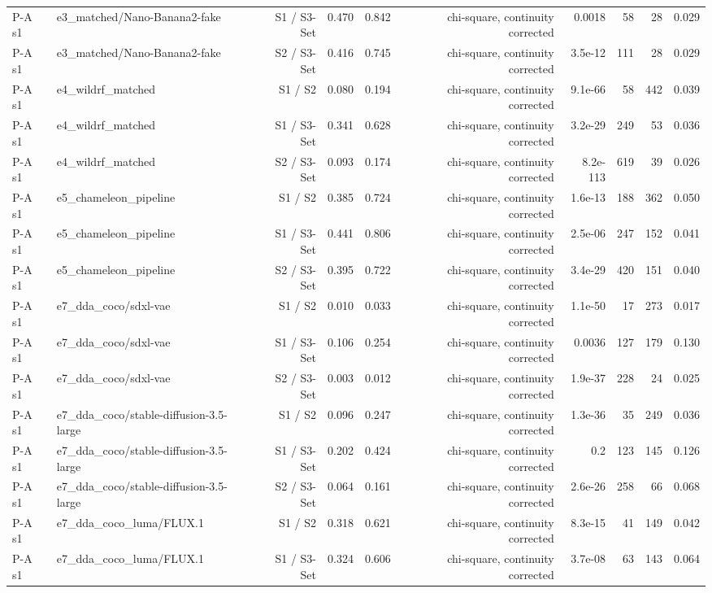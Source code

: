 \begin{table}[htbp]
\begin{tabular}{llrrrrrrrr}
P-A s1 & e3\_matched/Nano-Banana2-fake & S1 / S3-Set & 0.470 & 0.842 & chi-square, continuity corrected & 0.0018 & 58 & 28 & 0.029 \\
P-A s1 & e3\_matched/Nano-Banana2-fake & S2 / S3-Set & 0.416 & 0.745 & chi-square, continuity corrected & 3.5e-12 & 111 & 28 & 0.029 \\
P-A s1 & e4\_wildrf\_matched & S1 / S2 & 0.080 & 0.194 & chi-square, continuity corrected & 9.1e-66 & 58 & 442 & 0.039 \\
P-A s1 & e4\_wildrf\_matched & S1 / S3-Set & 0.341 & 0.628 & chi-square, continuity corrected & 3.2e-29 & 249 & 53 & 0.036 \\
P-A s1 & e4\_wildrf\_matched & S2 / S3-Set & 0.093 & 0.174 & chi-square, continuity corrected & 8.2e-113 & 619 & 39 & 0.026 \\
P-A s1 & e5\_chameleon\_pipeline & S1 / S2 & 0.385 & 0.724 & chi-square, continuity corrected & 1.6e-13 & 188 & 362 & 0.050 \\
P-A s1 & e5\_chameleon\_pipeline & S1 / S3-Set & 0.441 & 0.806 & chi-square, continuity corrected & 2.5e-06 & 247 & 152 & 0.041 \\
P-A s1 & e5\_chameleon\_pipeline & S2 / S3-Set & 0.395 & 0.722 & chi-square, continuity corrected & 3.4e-29 & 420 & 151 & 0.040 \\
P-A s1 & e7\_dda\_coco/sdxl-vae & S1 / S2 & 0.010 & 0.033 & chi-square, continuity corrected & 1.1e-50 & 17 & 273 & 0.017 \\
P-A s1 & e7\_dda\_coco/sdxl-vae & S1 / S3-Set & 0.106 & 0.254 & chi-square, continuity corrected & 0.0036 & 127 & 179 & 0.130 \\
P-A s1 & e7\_dda\_coco/sdxl-vae & S2 / S3-Set & 0.003 & 0.012 & chi-square, continuity corrected & 1.9e-37 & 228 & 24 & 0.025 \\
P-A s1 & e7\_dda\_coco/stable-diffusion-3.5-large & S1 / S2 & 0.096 & 0.247 & chi-square, continuity corrected & 1.3e-36 & 35 & 249 & 0.036 \\
P-A s1 & e7\_dda\_coco/stable-diffusion-3.5-large & S1 / S3-Set & 0.202 & 0.424 & chi-square, continuity corrected & 0.2 & 123 & 145 & 0.126 \\
P-A s1 & e7\_dda\_coco/stable-diffusion-3.5-large & S2 / S3-Set & 0.064 & 0.161 & chi-square, continuity corrected & 2.6e-26 & 258 & 66 & 0.068 \\
P-A s1 & e7\_dda\_coco\_luma/FLUX.1 & S1 / S2 & 0.318 & 0.621 & chi-square, continuity corrected & 8.3e-15 & 41 & 149 & 0.042 \\
P-A s1 & e7\_dda\_coco\_luma/FLUX.1 & S1 / S3-Set & 0.324 & 0.606 & chi-square, continuity corrected & 3.7e-08 & 63 & 143 & 0.064 \\

\end{tabular}
\end{table}
